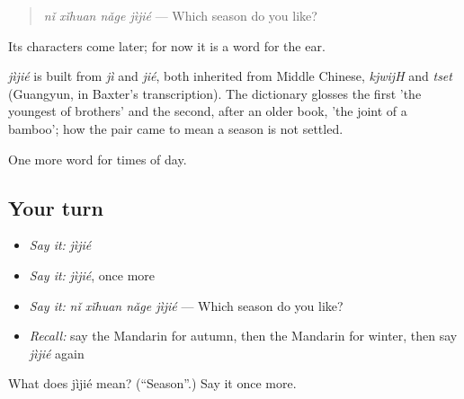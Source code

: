 \begin{quote}
\emph{nǐ xǐhuan nǎge jìjié} — Which season do you like?
\end{quote}

Its characters come later; for now it is a word for the ear.

\begin{cousinweb}
\emph{jìjié} is built from \emph{jì} and \emph{jié}, both inherited from Middle Chinese, \emph{kjwijH} and \emph{tset} (Guangyun, in Baxter's transcription). The dictionary glosses the first 'the youngest of brothers' and the second, after an older book, 'the joint of a bamboo'; how the pair came to mean a season is not settled.
\end{cousinweb}

\begin{grammarlens}[title={What you've built}]
One more word for times of day.
\end{grammarlens}

\subsection*{Your turn}
\begin{itemize}
\raggedright
  \item \emph{Say it:} \emph{jìjié}
  \item \emph{Say it:} \emph{jìjié}, once more
  \item \emph{Say it:} \emph{nǐ xǐhuan nǎge jìjié} — Which season do you like?
  \item \emph{Recall:} say the Mandarin for autumn, then the Mandarin for winter, then say \emph{jìjié} again
\end{itemize}

\begin{tcolorbox}[breakable,colback=teal!4,colframe=teal!35!black,title={Before you move on}]
What does jìjié mean? (\textquotedblleft{}Season\textquotedblright{}.) Say it once more.
\end{tcolorbox}
